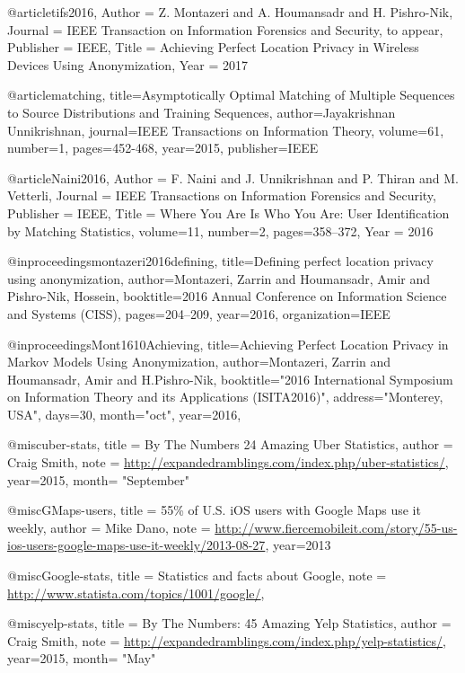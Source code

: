@article{tifs2016,
	Author = {Z. Montazeri and A. Houmansadr and H. Pishro-Nik},
	Journal = {IEEE Transaction on Information Forensics and Security, to appear},
	Publisher = {IEEE},
	Title = {{Achieving Perfect Location Privacy in Wireless Devices Using Anonymization}},
	Year = {2017}}
	
	@article{matching,
  title={Asymptotically Optimal Matching of Multiple Sequences to Source Distributions and Training Sequences},
  author={Jayakrishnan Unnikrishnan},
  journal={IEEE Transactions on Information Theory},
  volume={61},
  number={1},
  pages={452-468},
  year={2015},
  publisher={IEEE}
}

@article{Naini2016,
	Author = {F. Naini and J. Unnikrishnan and P. Thiran and M. Vetterli},
	Journal = {IEEE Transactions on Information Forensics and Security},
	Publisher = {IEEE},
	Title = {Where You Are Is Who You Are: User Identification by Matching Statistics},
	 volume={11},
    number={2},
     pages={358--372},
    Year = {2016}
}



@inproceedings{montazeri2016defining,
    title={Defining perfect location privacy using anonymization},
    author={Montazeri, Zarrin and Houmansadr, Amir and Pishro-Nik, Hossein},
    booktitle={2016 Annual Conference on Information Science and Systems (CISS)},
    pages={204--209},
    year={2016},
    organization={IEEE}
  }	
	
	
@inproceedings{Mont1610Achieving,
  title={Achieving Perfect Location Privacy in Markov Models Using Anonymization},
  author={Montazeri, Zarrin and Houmansadr, Amir and H.Pishro-Nik},
  booktitle="2016 International Symposium on Information Theory and its Applications
  (ISITA2016)",
  address="Monterey, USA",
  days=30,
  month="oct",
  year=2016,
}

@misc{uber-stats,
title = {{By The Numbers 24 Amazing Uber Statistics}},
author = {Craig Smith},
note = {\url{http://expandedramblings.com/index.php/uber-statistics/}},
year=2015,
month= "September"
}


@misc{GMaps-users,
title = {{55\% of U.S. iOS users with Google Maps use it weekly}},
author = {Mike Dano},
note = {\url{http://www.fiercemobileit.com/story/55-us-ios-users-google-maps-use-it-weekly/2013-08-27}},
year=2013
}

@misc{Google-stats,
title = {{Statistics and facts about Google}},
note = {\url{http://www.statista.com/topics/1001/google/}},
}

@misc{yelp-stats,
title = {{By The Numbers: 45 Amazing Yelp Statistics}},
author = {Craig Smith},
note = {\url{http://expandedramblings.com/index.php/yelp-statistics/}},
year=2015,
month= "May"
}


